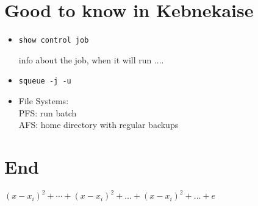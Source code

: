 \documentclass{article}
\begin{document}
\section{Good to know in Kebnekaise}
\begin{itemize}
\item \begin {verbatim}show control job\end{verbatim}  info about the job, when it will run ....
\item \texttt{squeue -j -u }
\item File Systems:\\
 PFS: run batch \\
  AFS: home directory with regular backups
\end{itemize}
\section{End}
$(x-x_i)^2+\cdots+(x-x_i)^2+\dots+(x-x_i)^2+\ldots +e$
\end{document}
